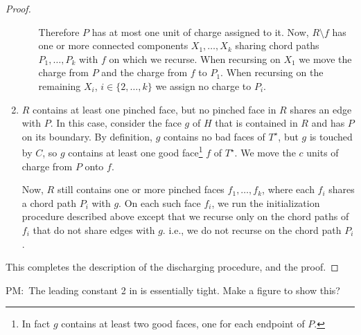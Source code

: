 \documentclass{patmorin}
\newcommand{\dual}[1]{{#1}^\star}
\newcommand{\note}[2]{{\color{red}#1:~#2}}
\begin{document}
\begin{proof}
\begin{enumerate}
\begin{enumerate}
        Therefore $P$ has at most one unit of charge assigned to it.
        Now, $R\setminus f$ has one or more connected components
        $X_1,\ldots,X_k$ sharing chord paths $P_1,\ldots,P_k$ with $f$
        on which we recurse.  When recursing on $X_1$ we move the charge
        from $P$ and the charge from $f$ to $P_1$.  When recursing on
        the remaining $X_i$, $i\in\{2,\ldots,k\}$ we assign no charge
        to $P_i$.
  \end{enumerate}
  \item $R$ contains at least one pinched face, but no pinched face in $R$
  shares an edge with $P$.  In this case, consider the face $g$ of $H$
  that is contained in $R$ and has $P$ on its boundary. By definition,
  $g$ contains no bad faces of $\dual{T}$, but $g$ is touched by $C$,
  so $g$ contains at least one good face\footnote{In fact $g$ contains at
  least two good faces, one for each endpoint of $P$.} $f$ of $\dual{T}$.
  We move the $c$ units of charge from $P$ onto $f$.

  Now, $R$ still contains one or more pinched faces
  $f_1,\ldots,f_k$, where each $f_i$ shares a chord path $P_i$ with $g$.
  On each such face $f_i$, we run the initialization procedure described
  above except that we recurse only on the chord paths of $f_i$ that
  do not share edges with $g$. i.e., we do not recurse on the chord
  path $P_i$.
\end{enumerate}
   This completes the description of the discharging procedure, and the proof.
\end{proof}

\note{PM}{The leading constant 2 in \lemref{many-caressed-or-high-degree}
is essentially tight. Make a figure to show this?}
\end{document}
